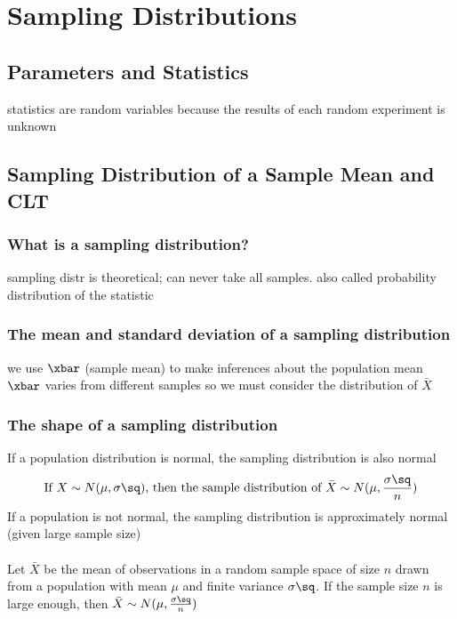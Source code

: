 \chapter{Sampling Distributions}  %

\section{Parameters and Statistics}  %


statistics are random variables because the results of each random experiment is unknown

\section{Sampling Distribution of a Sample Mean and CLT}  %
\subsection{What is a sampling distribution?}  %
sampling distr is theoretical; can never take all samples. also called probability distribution of the statistic

\subsection{The mean and standard deviation of a sampling distribution}  %
we use \(\xbar\) (sample mean) to make inferences about the population mean \\
\(\xbar\) varies from different samples so we must consider the distribution of \(\bar X\) \\

\subsection{The shape of a sampling distribution}  %
If a population distribution is normal, the sampling distribution is also normal
\[
    \text{If } X\sim N(\mu,\sigma\sq)\text{, then the sample distribution of }\bar X\sim N(\mu,\frac{\sigma\sq}{n})
\]
If a population is not normal, the sampling distribution is approximately normal (given large sample size)\\\\
Let $\bar X$ be the mean of observations in a random sample space of size \(n\) drawn from a population with mean \(\mu\) and finite variance \(\sigma\sq\). If the sample size \(n\) is large enough, then \(\bar X\sim N(\mu,\frac{\sigma\sq}{n})\)
